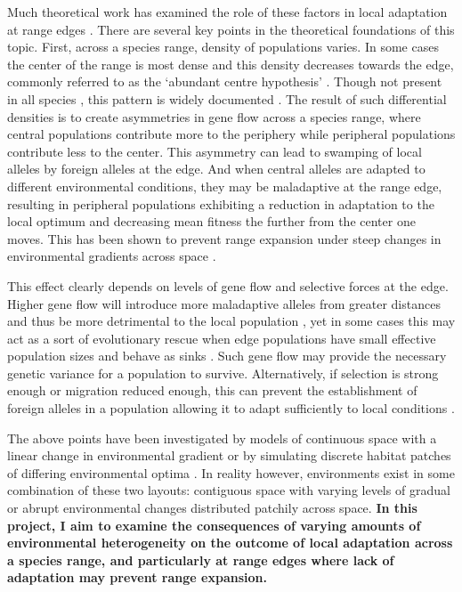 Much theoretical work has examined the role of these factors in local adaptation at range 
edges \citep{GarciaRamos:1997,Ibrahim:1996,Gomulkiewicz:1995,Atkins:2010}. There are 
several key points in the theoretical foundations of this topic. First, across a species range, 
density of populations varies. In some cases the center of the range is most dense and this 
density decreases towards the edge, commonly referred to as the `abundant centre hypothesis' 
\citep{Brown:1984}. Though not present in all species \citep{Sagarin:2006}, this pattern 
is widely documented \citep{Antonovics:1976,Yeh:1979,ECKERT:2008}. %
The result of such differential densities is to create asymmetries in gene flow across a 
species range, where central populations contribute more to the periphery while peripheral 
populations contribute less to the center. This asymmetry can lead to swamping of local alleles 
by foreign alleles at the edge. And when central alleles are adapted to different environmental 
conditions, they may be maladaptive at the range edge, resulting in peripheral populations 
exhibiting a reduction in adaptation to the local optimum and decreasing mean fitness the 
further from the center one moves. This has been shown to prevent range expansion under steep 
changes in environmental gradients across space \citep{Kirkpatrick:1997}.

This effect clearly depends on levels of gene flow and selective forces at the edge. Higher gene flow will introduce more maladaptive alleles from greater distances and thus be more detrimental to the local population \citep{GarciaRamos:1997uu}, yet in some cases this may act as a sort of evolutionary rescue when edge populations have small effective population sizes and behave as sinks \citep{Holt:1997tp,Gomulkiewicz:1999wj,Ching:2012jk}. Such gene flow may provide the necessary genetic variance for a population to survive. Alternatively, if selection is strong enough or migration reduced enough, this can prevent the establishment of foreign alleles in a population allowing it to adapt sufficiently to local conditions \citep{Ronce:2001vpa}.

The above points have been investigated by models of continuous space with a linear change in environmental gradient \citep{Pease:1989wj,Kirkpatrick:1997jo,GarciaRamos:1997uu,Case:2000ci,Polechova:2009ir,Bridle:2010km} or by simulating discrete habitat patches of differing environmental optima \citep{Guilee:2012hk,Ronce:2001vpa,Gomulkiewicz:1999wj}. In reality however, environments exist in some combination of these two layouts: contiguous space with varying levels of gradual or abrupt environmental changes distributed patchily across space. \textbf{In this project, I aim to examine the consequences of varying amounts of environmental heterogeneity on the outcome of local adaptation across a species range, and particularly at range edges where lack of adaptation may prevent range expansion.}

